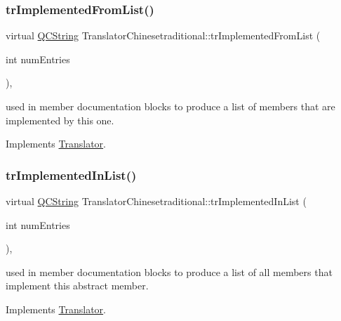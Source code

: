 \subsubsection{\texorpdfstring{trImplementedFromList()}{trImplementedFromList()}}
{\footnotesize\ttfamily virtual \mbox{\hyperlink{class_q_c_string}{Q\+C\+String}} Translator\+Chinesetraditional\+::tr\+Implemented\+From\+List (\begin{DoxyParamCaption}\item[{int}]{num\+Entries }\end{DoxyParamCaption})\hspace{0.3cm}{\ttfamily [inline]}, {\ttfamily [virtual]}}

used in member documentation blocks to produce a list of members that are implemented by this one. 

Implements \mbox{\hyperlink{class_translator}{Translator}}.

\mbox{\label{class_translator_chinesetraditional_a0e333fc233c2a61076715266cb684c77}} 
\subsubsection{\texorpdfstring{trImplementedInList()}{trImplementedInList()}}
{\footnotesize\ttfamily virtual \mbox{\hyperlink{class_q_c_string}{Q\+C\+String}} Translator\+Chinesetraditional\+::tr\+Implemented\+In\+List (\begin{DoxyParamCaption}\item[{int}]{num\+Entries }\end{DoxyParamCaption})\hspace{0.3cm}{\ttfamily [inline]}, {\ttfamily [virtual]}}

used in member documentation blocks to produce a list of all members that implement this abstract member. 

Implements \mbox{\hyperlink{class_translator}{Translator}}.

\mbox{\label{class_translator_chinesetraditional_a040b175f68da5d4dc7efee16a08a634c}} 
